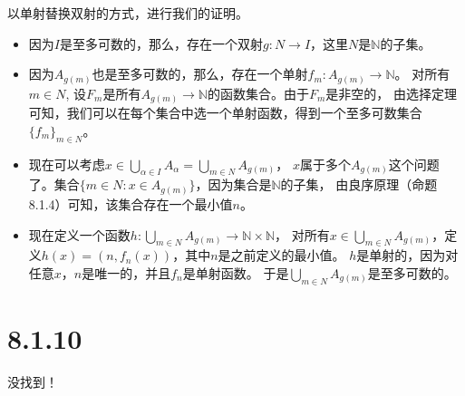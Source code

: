 \documentclass{article}
\theoremstyle{mystyle}
\begin{document}
以单射替换双射的方式，进行我们的证明。

\begin{itemize}
  \item 因为$I$是至多可数的，那么，存在一个双射$g: N \rightarrow I$，这里$N$是$\mathbb{N}$的子集。
  \item 因为$A_{g(m)}$也是至多可数的，那么，存在一个单射$f_m : A_{g(m)} \rightarrow \mathbb{N}$。
  对所有$m \in N$, 设$F_m$是所有$A_{g(m)} \rightarrow \mathbb{N}$的函数集合。由于$F_m$是非空的，
  由选择定理可知，我们可以在每个集合中选一个单射函数，得到一个至多可数集合$\{f_m\}_{m \in N}$。
  \item 现在可以考虑$x \in \bigcup \limits_{\alpha \in I} A_{\alpha} = \bigcup \limits_{m \in N} A_{g(m)}$，
  $x$属于多个$A_{g(m)}$这个问题了。集合$\{m \in N : x \in A_{g(m)}\}$，因为集合是$\mathbb{N}$的子集，
  由良序原理（命题8.1.4）可知，该集合存在一个最小值$n$。
  \item 现在定义一个函数$h: \bigcup \limits_{m \in N} A_{g(m)} \rightarrow \mathbb{N} \times \mathbb{N}$，
  对所有$x \in \bigcup \limits_{m \in N} A_{g(m)}$，定义$h(x) = (n, f_n(x))$，其中$n$是之前定义的最小值。
  $h$是单射的，因为对任意$x$，$n$是唯一的，并且$f_n$是单射函数。
  于是$\bigcup \limits_{m \in N} A_{g(m)}$是至多可数的。
\end{itemize}

\section*{8.1.10}
没找到！
\end{document}
